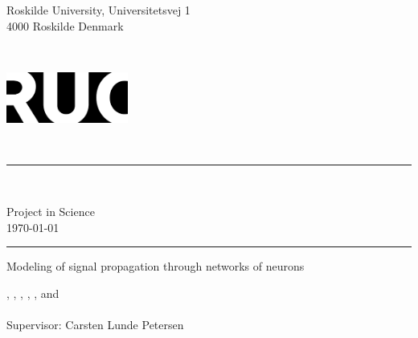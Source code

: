 

\begin{titlepage}
    {\selectfont %



        \noindent
        \begin{minipage}{.45\textwidth}
            \begin{flushleft}
                Roskilde University, Universitetsvej 1\\ 4000 Roskilde Denmark
            \end{flushleft}
        \end{minipage}%
        ~
        \begin{minipage}{.5\textwidth}
            \begin{flushright}
                \includegraphics[width=4cm]{Pictures/RUCLOGO.png}
            \end{flushright}
        \end{minipage}\\

        \noindent\rule{\linewidth}{0.4mm}\\
        \begin{center}
            Project in Science\\
            \today
        \end{center}
        \rule{\linewidth}{0.4mm}


        \begin{flushleft}
            \noindent
            \Huge Modeling of signal propagation through networks of neurons
            \huge 
        \end{flushleft}

        \noindent
        ,     
        ,         
        , 
        ,  
        , and \\      
        \\ 
        Supervisor: Carsten Lunde Petersen  

        \vfill
        
        

        \vfill
    }
\end{titlepage}

